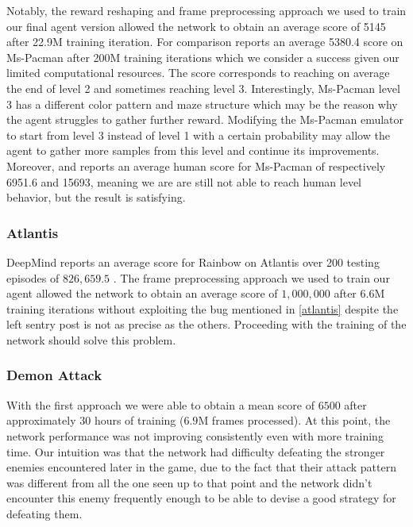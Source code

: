 \documentclass[10pt,twocolumn,letterpaper]{article}
\begin{document}
Notably, the reward reshaping and frame preprocessing approach we used to train our final agent version allowed the network to obtain an average score of 5145 after 22.9M training iteration. For comparison \cite{DBLP:journals/corr/abs-1710-02298} reports an average 5380.4 score on Ms-Pacman after 200M training iterations which we consider a success given our limited computational resources.
The score corresponds to reaching on average the end of level 2 and sometimes reaching level 3. Interestingly, Ms-Pacman level 3 has a different color pattern and maze structure which may be the reason why the agent struggles to gather further reward. Modifying the Ms-Pacman emulator to start from level 3 instead of level 1 with a certain probability may allow the agent to gather more samples from this level and continue its improvements.
Moreover, \cite{DBLP:journals/corr/WangFL15} and \cite{humancontrol} reports an average human score for Ms-Pacman of respectively 6951.6 and 15693, meaning we are are still not able to reach human level behavior, but the result is satisfying.

\subsubsection{Atlantis}
DeepMind reports an average score for Rainbow on Atlantis over 200 testing episodes of $826,659.5$ \cite{DBLP:journals/corr/abs-1710-02298}. The frame preprocessing approach we used to train our agent allowed the network to obtain an average score of $1,000,000$ after $6.6$M training iterations without exploiting the bug mentioned in \ref{atlantis} despite the left sentry post is not as precise as the others.  Proceeding with the training of the network should solve this problem.

\subsubsection{Demon Attack} 
With the first approach we were able to obtain a mean score of $6500$ after approximately $30$ hours of training ($6.9$M frames processed). At this point, the network performance was not improving consistently even with more training time. Our intuition was that the network had difficulty defeating the stronger enemies encountered later in the game, due to the fact that their attack pattern was different from all the one seen up to that point and the network didn't encounter this enemy frequently enough to be able to devise a good strategy for defeating them.
\end{document}
